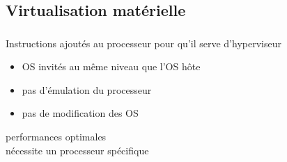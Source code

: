 \subsection{Virtualisation matérielle}
\begin{frame}
\frametitle{\insertsubsection}
Instructions ajoutés au processeur pour qu’il serve d’hyperviseur
\begin{itemize}
\item OS invités au même niveau que l'OS hôte
\item pas d'émulation du processeur
\item pas de modification des OS
\end{itemize}
\vspace{0.5cm}

 performances optimales \\
 nécessite un processeur spécifique
\end{frame}


